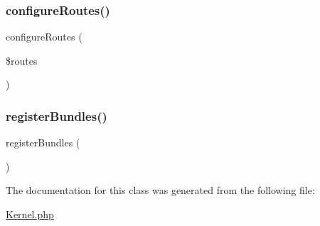 \mbox{\label{class_app_1_1_kernel_a07bf0718482c124f9f0df16ddfa4329b}} 
\subsubsection{\texorpdfstring{configureRoutes()}{configureRoutes()}}
{\footnotesize\ttfamily configure\+Routes (\begin{DoxyParamCaption}\item[{Route\+Collection\+Builder}]{\$routes }\end{DoxyParamCaption})\hspace{0.3cm}{\ttfamily [protected]}}

\mbox{\label{class_app_1_1_kernel_a8dd304e2eccfbe88dd648389c7d4f5eb}} 
\subsubsection{\texorpdfstring{registerBundles()}{registerBundles()}}
{\footnotesize\ttfamily register\+Bundles (\begin{DoxyParamCaption}{ }\end{DoxyParamCaption})}



The documentation for this class was generated from the following file\+:\begin{DoxyCompactItemize}
\item 
\mbox{\hyperlink{_kernel_8php}{Kernel.\+php}}\end{DoxyCompactItemize}
